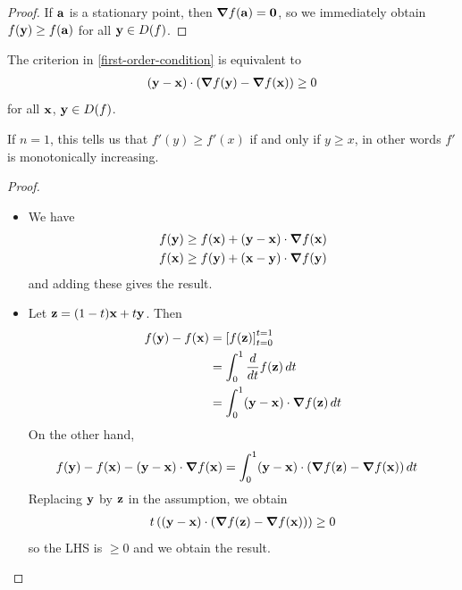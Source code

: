 \documentclass{../template/note}
\begin{document}
    \begin{proof}
        If $\V a$ is a stationary point, then $\grad f(\V a) = \V 0$, so we immediately obtain $f(\V y) \geq f(\V a)$ for all $\V y \in D(f)$.
    \end{proof}
    
    \begin{proposition}
        \label{grad-dot-criterion}
        The criterion in \cref{first-order-condition} is equivalent to
        \begin{align*}
            (\V y - \V x) \cdot (\grad f(\V y) - \grad f(\V x)) \geq 0
        \end{align*}
        for all $\V x$, $\V y \in D(f)$.        
    \end{proposition}
    
    \begin{remark*}
        If $n=1$, this tells us that $f'(y) \geq f'(x)$ if and only if $y \geq x$, in other words $f'$ is monotonically increasing.
    \end{remark*}

    \begin{proof}
        \begin{itemize}
            \item[$\implies$] We have
            \begin{align*}
                f(\V y) &\geq f(\V x) + (\V y - \V x) \cdot \grad f(\V x) \\
                f(\V x) &\geq f(\V y) + (\V x - \V y) \cdot \grad f(\V y)
            \end{align*}
            and adding these gives the result.
            \item[$\impliedby$] Let $\V z = (1-t) \V x + t \V y$. Then
            \begin{align*}
                f(\V y) - f(\V x) &= \left[f(\V z)\right]_{t=0}^{t=1} \\
                &= \int_0^1 \frac{d}{dt} f(\V z) \D t \\
                &= \int_0^1 (\V y - \V x) \cdot \grad f(\V z) \D t
            \end{align*}
            On the other hand,
            \begin{align*}
                f(\V y) - f(\V x) - (\V y - \V x) \cdot \grad f(\V x) &= \int_0^1 (\V y - \V x) \cdot (\grad f(\V z) - \grad f(\V x)) \D t
            \end{align*}
            Replacing $\V y$ by $\V z$ in the assumption, we obtain
            \begin{align*}
                t \left((\V y - \V x) \cdot (\grad f(\V z) - \grad f(\V x))\right) \geq 0
            \end{align*}
            so the LHS is $\geq 0$ and we obtain the result.           
        \end{itemize}
    \end{proof}
    
\end{document}
